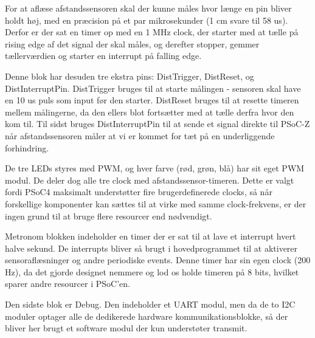 For at aflæse afstandssensoren skal der kunne måles hvor længe en pin bliver holdt høj, med en præcision på et par mikrosekunder (1 cm svare til 58 us). Derfor er der sat en timer op med en 1 MHz clock, der starter med at tælle på rising edge af det signal der skal måles, og derefter stopper, gemmer tællerværdien og starter en interrupt på falling edge.

Denne blok har desuden tre ekstra pins: DistTrigger, DistReset, og DistInterruptPin. DistTrigger bruges til at starte målingen - sensoren skal have en 10 us puls som input før den starter. DistReset bruges til at resette timeren mellem målingerne, da den ellers blot fortsætter med at tælle derfra hvor den kom til. Til sidst bruges DistInterruptPin til at sende et signal direkte til PSoC-Z når afstandssensoren måler at vi er kommet for tæt på en underliggende forhindring.

De tre LEDs styres med PWM, og hver farve (rød, grøn, blå) har sit eget PWM modul. De deler dog alle tre clock med afstandssensor-timeren. Dette er valgt fordi PSoC4 maksimalt understøtter fire brugerdefinerede clocks, så når forskellige komponenter kan sættes til at virke med samme clock-frekvens, er der ingen grund til at bruge flere resourcer end nødvendigt.

Metronom blokken indeholder en timer der er sat til at lave et interrupt hvert halve sekund. De interrupts bliver så brugt i hovedprogrammet til at aktiverer sensoraflæsninger og andre periodiske events. Denne timer har sin egen clock (200 Hz), da det gjorde designet nemmere og lod os holde timeren på 8 bits, hvilket sparer andre resourcer i PSoC'en.

Den sidste blok er Debug. Den indeholder et UART modul, men da de to I2C moduler optager alle de dedikerede hardware kommunikationsblokke, så der bliver her brugt et software modul der kun understøter transmit.
